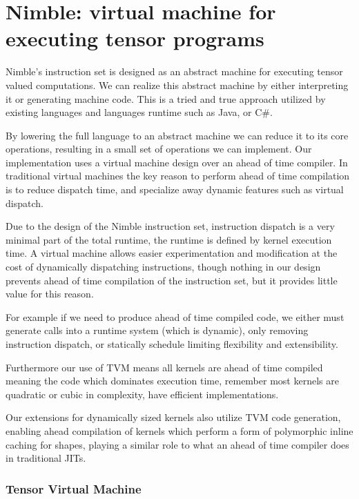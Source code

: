 \chapter{Nimble: virtual machine for executing tensor programs}
\label{ch:nimble}

Nimble's instruction set is designed as an abstract machine for executing tensor valued
computations. We can realize this abstract machine by either interpreting it or generating
machine code. This is a tried and true approach utilized by existing languages and languages
runtime such as Java, or C\#.

By lowering the full language to an abstract machine we can reduce it to its core operations,
resulting in a small set of operations we can implement. Our implementation uses a virtual
machine design over an ahead of time compiler. In traditional virtual machines the key
reason to perform ahead of time compilation is to reduce dispatch time, and specialize
away dynamic features such as virtual dispatch.

Due to the design of the Nimble instruction set, instruction dispatch is a very minimal
part of the total runtime, the runtime is defined by kernel execution time.
A virtual machine allows easier experimentation and modification at the cost of dynamically
dispatching instructions, though nothing in our design prevents ahead of time compilation
of the instruction set, but it provides little value for this reason.

For example if we need to produce ahead of time
compiled code, we either must generate calls into a runtime system (which is dynamic),
only removing instruction dispatch, or statically schedule limiting flexibility and
extensibility.

Furthermore our use of TVM means all kernels are ahead of time compiled meaning the
code which dominates execution time, remember most kernels are quadratic or cubic in
complexity, have efficient implementations.

Our extensions for dynamically sized kernels also utilize TVM code generation, enabling
ahead compilation of kernels which perform a form of polymorphic inline caching for shapes,
playing a similar role to what an ahead of time compiler does in traditional JITs.



\subsection{Tensor Virtual Machine}

